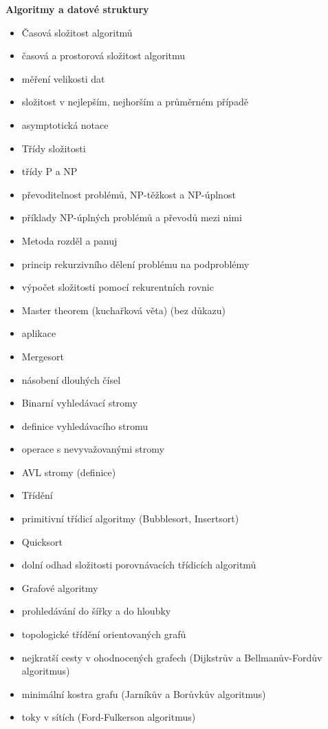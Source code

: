 \begin{tema}
\textbf{Algoritmy a datové struktury}
\begin{itemize}[leftmargin=1.2em,itemsep=0pt,topsep=1pt]
  \item Časová složitost algoritmů
  \item časová a prostorová složitost algoritmu
  \item měření velikosti dat
  \item složitost v nejlepším, nejhorším a průměrném případě
  \item asymptotická notace
  \item Třídy složitosti
  \item třídy P a NP
  \item převoditelnost problémů, NP-těžkost a NP-úplnost
  \item příklady NP-úplných problémů a převodů mezi nimi
  \item Metoda rozděl a panuj
  \item princip rekurzivního dělení problému na podproblémy
  \item výpočet složitosti pomocí rekurentních rovnic
  \item Master theorem (kuchařková věta) (bez důkazu)
  \item aplikace
  \item Mergesort
  \item násobení dlouhých čísel
  \item Binarní vyhledávací stromy
  \item definice vyhledávacího stromu
  \item operace s nevyvažovanými stromy
  \item AVL stromy (definice)
  \item Třídění
  \item primitivní třídicí algoritmy (Bubblesort, Insertsort)
  \item Quicksort
  \item dolní odhad složitosti porovnávacích třídicích algoritmů
  \item Grafové algoritmy
  \item prohledávání do šířky a do hloubky
  \item topologické třídění orientovaných grafů
  \item nejkratší cesty v ohodnocených grafech (Dijkstrův a Bellmanův-Fordův algoritmus)
  \item minimální kostra grafu (Jarníkův a Borůvkův algoritmus)
  \item toky v sítích (Ford-Fulkerson algoritmus)
\end{itemize}
\end{tema}
\begin{vezkratce}
\end{vezkratce}

